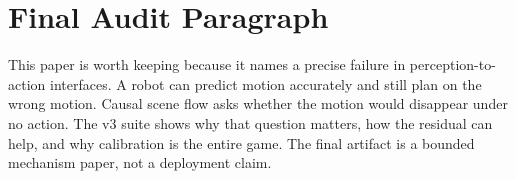 \documentclass{article}
\begin{document}
\section{Final Audit Paragraph}

This paper is worth keeping because it names a precise failure in perception-to-action
interfaces.  A robot can predict motion accurately and still plan on the wrong motion.
Causal scene flow asks whether the motion would disappear under no action.  The v3 suite
shows why that question matters, how the residual can help, and why calibration is the
entire game.  The final artifact is a bounded mechanism paper, not a deployment claim.
\end{document}
